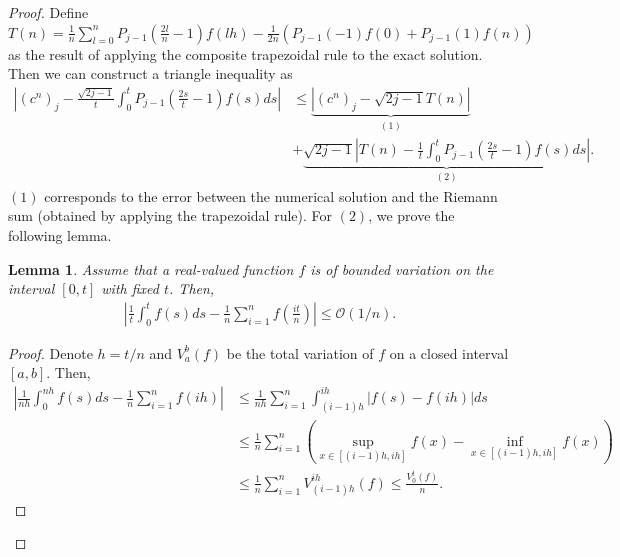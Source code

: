 \documentclass{article}
\newtheorem{lemma}{Lemma}
\theoremstyle{definition}
\newcommand{\pr}[1]{ \left( #1 \right) }
\newcommand{\abs}[1]{\left| #1 \right|}
\begin{document}
\begin{proof}
Define $T(n) = \frac{1}{n}\sum_{l=0}^{n}
P_{j-1}\pr{\frac{2l}{n}-1} f(lh) - \frac{1}{2n} \pr{P_{j-1}(-1) f(0) + P_{j-1}(1) f(n)}$ as the result of applying the composite trapezoidal rule to the exact solution. Then we can construct a triangle inequality as
\begin{align} \label{ineq:conv_rate_start}
    \left| \pr{c^n}_j - \frac{\sqrt{2j-1}}{t}\int_0^t P_{j-1}\pr{\frac{2s}{t}-1}f(s)ds \right| 
    &\leq 
    \underbrace{\left|  \pr{c^n}_j 
    -  \sqrt{2j-1} T(n) \right|}_{(1)}\\
    &+ \underbrace{\sqrt{2j-1} \left| T(n)
    - \frac{1}{t}\int_0^t P_{j-1}\pr{\frac{2s}{t}-1}f(s)ds \right|}_{(2)}. \nonumber
\end{align}
$(1)$ corresponds to the error between the numerical solution and the Riemann sum (obtained by applying the trapezoidal rule).
For $(2)$, we prove the following lemma.
\begin{lemma}
    Assume that a real-valued function $f$ is of bounded variation on the interval $[0,t]$ with fixed $t$. Then, 
    \begin{align*}
        \abs{\frac{1}{t} \int_0^t f(s)ds - \frac{1}{n} \sum_{i=1}^{n}f\pr{\frac{it}{n}}} \leq \mathcal{O}(1/n).
    \end{align*}
\end{lemma}

\begin{proof}
    Denote $h = t/n$ and $V_a^b(f)$ be the total variation of $f$ on a closed interval $[a,b]$. Then,
    \begin{align*}
        \abs{
        \frac{1}{nh}\int_0^{nh}f(s)ds - \frac{1}{n} \sum_{i=1}^{n}f\pr{ih}
        }
        &\leq \frac{1}{nh} \sum_{i=1}^n 
        \int_{(i-1)h}^{ih} \abs{f(s) - f(ih)} ds\\
        &\leq \frac{1}{n} \sum_{i=1}^n \pr{ \sup_{x \in [(i-1)h, ih]} f(x) - \inf_{x \in [(i-1)h, ih]} f(x) } \\
        &\leq \frac{1}{n} \sum_{i=1}^n V_{(i-1)h}^{ih}(f)
        \leq \frac{V_0^t (f)}{n}.
    \end{align*}
\end{proof}


\end{proof}
\end{document}

